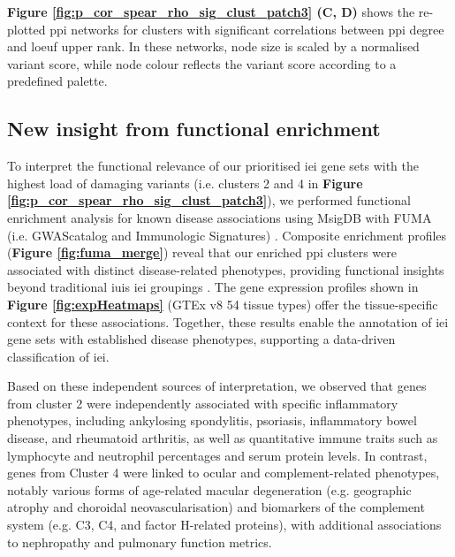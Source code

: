 \textbf{Figure \ref{fig:p_cor_spear_rho_sig_clust_patch3} (C, D)} shows the re-plotted \ac{ppi} networks for clusters with significant correlations between \ac{ppi} degree and \ac{loeuf} upper rank. In these networks, node size is scaled by a normalised variant score, while node colour reflects the variant score according to a predefined palette.

\subsection{New insight from functional enrichment}
To interpret the functional relevance of our prioritised \ac{iei} gene sets with the highest load of damaging variants (i.e. clusters 2 and 4 in \textbf{Figure \ref{fig:p_cor_spear_rho_sig_clust_patch3}}), we performed functional enrichment analysis for known disease associations using MsigDB with FUMA (i.e. GWAScatalog and Immunologic Signatures) \cite{watanabe_functional_2017}. Composite enrichment profiles (\textbf{Figure \ref{fig:fuma_merge}}) reveal that our enriched \ac{ppi} clusters were associated with distinct disease-related phenotypes, providing functional insights beyond traditional \ac{iuis} \ac{iei} groupings \cite{tangye_human_2022}. The gene expression profiles shown in \textbf{Figure \ref{fig:expHeatmaps}} (GTEx v8 54 tissue types) offer the tissue-specific context for these associations. Together, these results enable the annotation of \ac{iei} gene sets with established disease phenotypes, supporting a data-driven classification of \ac{iei}.

Based on these independent sources of interpretation, we observed that genes from cluster 2 were independently associated with specific inflammatory phenotypes, including ankylosing spondylitis, psoriasis, inflammatory bowel disease, and rheumatoid arthritis, as well as quantitative immune traits such as lymphocyte and neutrophil percentages and serum protein levels.
In contrast, genes from Cluster 4 were linked to ocular and complement-related phenotypes, notably various forms of age-related macular degeneration (e.g. geographic atrophy and choroidal neovascularisation) and biomarkers of the complement system (e.g. C3, C4, and factor H-related proteins), with additional associations to nephropathy and pulmonary function metrics.

